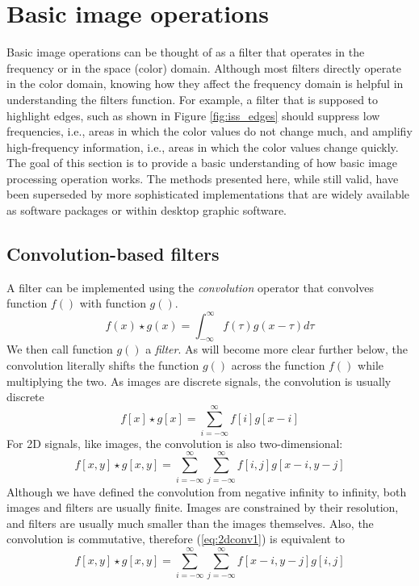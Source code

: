 \section{Basic image operations}
Basic image operations can be thought of as a filter that operates in the frequency or in the space (color) domain. Although most filters directly operate in the color domain, knowing how they affect the frequency domain is helpful in understanding the filters function. For example, a filter that is supposed to highlight edges, such as shown in Figure \ref{fig:iss_edges} should suppress low frequencies, i.e., areas in which the color values do not change much, and amplifiy high-frequency information, i.e., areas in which the color values change quickly. The goal of this section is to provide a basic understanding of how basic image processing operation works. The methods presented here, while still valid, have been superseded by more sophisticated implementations that are widely available as software packages or within desktop graphic software.

\subsection{Convolution-based filters}
 A filter can be implemented using the \emph{convolution}  operator that convolves function $f()$ with function $g()$. 
\begin{equation}
f(x)\star g(x)=\int_{-\infty}^{\infty}f(\tau)g(x-\tau)d\tau
\end{equation}
We then call function $g()$ a \emph{filter}. As will become more clear further below, the convolution literally shifts the function $g()$ across the function $f()$ while multiplying the two. As images are discrete signals, the convolution is usually discrete
\begin{equation}
f[x]\star g[x]=\sum_{i=-\infty}^{\infty}f[i]g[x-i]
\end{equation} 
For 2D signals, like images, the convolution is also two-dimensional:
\begin{equation}\label{eq:2dconv1}
f[x,y]\star g[x,y]=\sum_{i=-\infty}^{\infty}\sum_{j=-\infty}^{\infty}f[i,j]g[x-i,y-j]
\end{equation}
Although we have defined the convolution from negative infinity to infinity, both images and filters are usually finite. Images are constrained by their resolution, and filters are usually much smaller than the images themselves. Also, the convolution is commutative, therefore (\ref{eq:2dconv1}) is equivalent to 
\begin{equation}\label{eq:2dconv2}
f[x,y]\star g[x,y]=\sum_{i=-\infty}^{\infty}\sum_{j=-\infty}^{\infty}f[x-i,y-j]g[i,j]
\end{equation}

